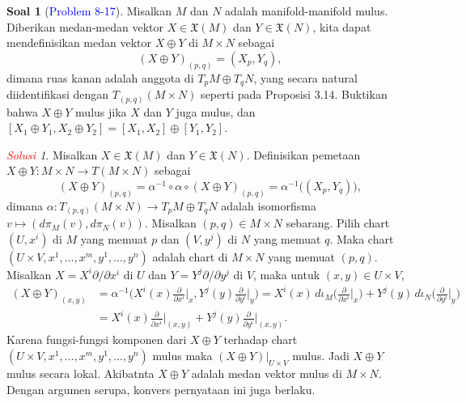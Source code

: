 \documentclass[11pt]{article}
\theoremstyle{definition}
\newtheorem*{problem}{Soal}
\theoremstyle{remark}
\newtheorem*{solution}{\textcolor{red}{Solusi}}
\newcommand{\ddxi}{\frac{\partial}{\partial x^i}}
\newcommand{\ddyi}{\frac{\partial}{\partial y^i}}
\begin{document}
\begin{problem}[\textcolor{blue}{Problem 8-17}]
Misalkan $M$ dan $N$ adalah manifold-manifold mulus. Diberikan medan-medan vektor $X \in \mathfrak{X}(M)$ dan $Y \in \mathfrak{X}(N)$, kita dapat mendefinisikan medan vektor $X \oplus Y$ di $M \times N$ sebagai
$$
(X \oplus Y)_{(p,q)} = (X_p,Y_q),
$$
dimana ruas kanan adalah anggota di $T_pM \oplus T_qN$, yang secara natural diidentifikasi  dengan $T_{(p,q)}(M \times N)$ seperti pada Proposisi 3.14. Buktikan bahwa $X \oplus Y$ mulus jika $X$ dan $Y$ juga mulus, dan $[X_1 \oplus Y_1, X_2 \oplus Y_2] = [X_1,X_2] \oplus [Y_1,Y_2]$.
\end{problem}
\begin{solution}
Misalkan $X \in \mathfrak{X}(M)$ dan $Y \in \mathfrak{X}(N)$. Definisikan pemetaan $X \oplus Y : M \times N \to T(M \times N)$ sebagai
$$
(X \oplus Y)_{(p,q)} = \alpha^{-1} \circ \alpha \circ (X\oplus Y)_{(p,q)} =  \alpha^{-1}\big( (X_p,Y_q) \big), 
$$
dimana $\alpha : T_{(p,q)}(M \times N) \to T_pM \oplus T_qN$ adalah isomorfisma $v \mapsto (d\pi_M(v), d\pi_N(v))$. Misalkan $(p,q) \in M \times N$ sebarang. Pilih chart $(U,x^i)$ di $M$ yang memuat $p$ dan $(V,y^j)$ di $N$ yang memuat $q$. Maka chart $(U \times V, x^1,\dots,x^m,y^1,\dots,y^n)$ adalah chart di $M \times N$ yang memuat $(p,q)$. Misalkan $X = X^i \partial/\partial x^i$ di $U$ dan $Y=Y^j\partial/\partial y^j$ di $V$, maka untuk $(x,y) \in U \times V$,
\begin{align*}
(X \oplus Y)_{(x,y)} &= \alpha^{-1} \Big( X^i(x) \ddxi\Big|_{x}, Y^j(y) \ddyi\Big|_{y} \Big) = X^i(x) \, d\iota_M\Big( \ddxi\Big|_{x} \Big) + Y^j(y) \,d\iota_N \Big( \ddyi\Big|_{y} \Big) \\
&= X^i(x) \ddxi\Big|_{(x,y)} + Y^j(y) \ddyi\Big|_{(x,y)}.
\end{align*}
Karena fungsi-fungsi komponen dari $X \oplus Y$ terhadap chart $(U\times V, x^1,\dots,x^m,y^1,\dots,y^n )$ mulus maka $(X \oplus Y)|_{U \times V}$ mulus. Jadi $X \oplus Y$ mulus secara lokal. Akibatnta $X \oplus Y$ adalah medan vektor mulus di $M \times N$. Dengan argumen serupa, konvers pernyataan ini juga berlaku.


\end{solution}
\end{document}
